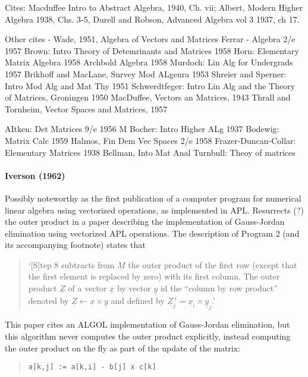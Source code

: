 Cites: Macduffee Intro to Abstract Algebra, 1940, Ch. vii; Albert, Modern Higher Algebra 1938, Chs. 3-5, Durell and Robson, Advanced Algebra vol 3 1937, ch 17.

Other cites -
Wade, 1951, Algebra of Vectors and Matrices
Ferrar - Algebra 2/e 1957
Brown: Intro Theory of Detemrinants and Matrices 1958
Horn: Elementary Matrix Algebra 1958
Archbold Algebra 1958
Murdoch: Lin Alg for Undergrads 1957
Brikhoff and MacLane, Survey Mod ALgenra 1953
Shreier and Sperner: Intro Mod Alg and Mat Thy 1951
Schwerdtfeger: Intro Lin Alg and the Theory of Matrices, Groningen 1950
MacDuffee, Vectors an Matrices, 1943
Thrall and Tornheim, Vector Spaces and Matrices, 1957

AItken: Det Matrices 9/e 1956
M Bocher: Intro Higher ALg 1937
Bodewig: Matrix Calc 1959
Halmos, Fin Dem Vec Spaces 2/e 1958
Frazer-Duncan-Collar: Elementary Matrices 1938
Bellman, Into Mat Anal
Turnbull: Theoy of matrices


\paragraph{Iverson (1962)~\cite{Iverson1962}}

Possibly noteworthy as the first publication of a computer program for numerical linear algebra using vectorized operations, as implemented in APL.
Resurrects (?) the outer product in a paper describing the implementation of Gauss-Jordan elimination using vectorized APL operations. The description of Program 2 (and its accompanying footnote) states that

\begin{quote}
`[S]tep 8 subtracts from $\underline{\textit{M}}$ the outer product of the first row (except that the first element is replaced by zero) with its first column. The outer product $\underline{\textit{Z}}$ of a vector $\underline{\textit{x}}$ by vector $\underline{\textit{y}}$ id the ``column by row product'' denoted by $\underline{\textit{Z}} \leftarrow \underline{\textit{x}} \times \underline{\textit{y}}$ and defined by $\underline{\textit{Z}}^{\; i}_j = \underline{\textit{x}}_i \times \underline{\textit{y}}_j$.'
\end{quote}

This paper cites an ALGOL implementation of Gauss-Jordan elimination, but this algorithm never computes the outer product explicitly, instead computing the outer product on the fly as part of the update of the matrix:~\cite{Cohen1961}

\begin{quote}
\begin{verbatim}
a[k,j] := a[k,i] - b[j] x c[k]
\end{verbatim}
\end{quote}

